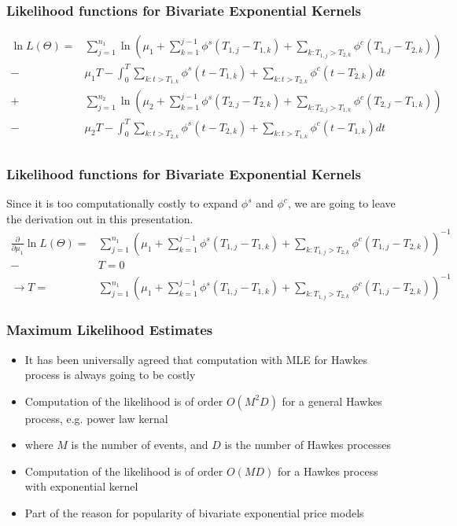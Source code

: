 \documentclass{beamer}
\begin{document}
\begin{frame}
\frametitle{Likelihood functions for Bivariate Exponential Kernels}
\begin{equation*}
\begin{split}
\ln L(\Theta) = & \sum_{j=1}^{n_1} \ln \left(\mu_1 + \sum_{k=1}^{j-1} \phi^s(T_{1,j} - T_{1,k}) + \sum_{k: T_{1,j}>T_{2,k}} \phi^{c}(T_{1,j} - T_{2,k}) \right) \\
- &\mu_1 T - \int_{0}^{T} \sum_{k: t>T_{1,k}} \phi^s(t - T_{1,k}) + \sum_{k: t>T_{2,k}} \phi^{c}(t - T_{2,k}) dt \\
+&\sum_{j=1}^{n_2} \ln \left(\mu_2 + \sum_{k=1}^{j-1} \phi^s(T_{2,j} - T_{2,k}) + \sum_{k: T_{2,j}>T_{1,k}} \phi^{c}(T_{2,j} - T_{1,k}) \right) \\
- & \mu_2 T - \int_{0}^{T} \sum_{k: t>T_{2,k}} \phi^s(t - T_{2,k}) + \sum_{k: t>T_{1,k}} \phi^{c}(t - T_{1,k}) dt\\
\end{split}
\end{equation*}
\end{frame}

\begin{frame}
\frametitle{Likelihood functions for Bivariate Exponential Kernels}
Since it is too computationally costly to expand $\phi^s$ and $\phi^c$, we are going to leave the derivation out in this presentation.
\begin{equation*}
\begin{split}
\frac{\partial}{\partial \mu_1} \ln L(\Theta) = & \sum_{j=1}^{n_1} \left(\mu_1 + \sum_{k=1}^{j-1} \phi^s(T_{1,j} - T_{1,k}) + \sum_{k: T_{1,j}>T_{2,k}} \phi^{c}(T_{1,j} - T_{2,k}) \right)^{-1} \\
- & T = 0\\
\to T = &\sum_{j=1}^{n_1} \left(\mu_1 + \sum_{k=1}^{j-1} \phi^s(T_{1,j} - T_{1,k}) + \sum_{k: T_{1,j}>T_{2,k}} \phi^{c}(T_{1,j} - T_{2,k}) \right)^{-1}
\end{split}
\end{equation*}
\end{frame}

\begin{frame}
\frametitle{Maximum Likelihood Estimates}
\begin{itemize}
	\item It has been universally agreed that computation with MLE for Hawkes process is always going to be costly
	\item Computation of the likelihood is of order $O(M^2D)$ for a general Hawkes process, e.g. power law kernal
	\item where $M$ is the number of events, and $D$ is the number of Hawkes processes
	\item Computation of the likelihood is of order $O(MD)$ for a Hawkes process with exponential kernel
	\item Part of the reason for popularity of bivariate exponential price models
\end{itemize}
\end{frame}
\end{document}
